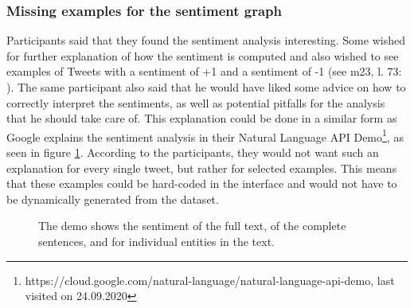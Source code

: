 \subsubsection*{Missing examples for the sentiment graph}
Participants said that they found the sentiment analysis interesting. Some wished for further explanation of how the sentiment is computed and also wished to see examples of Tweets with a sentiment of +1 and a sentiment of -1 (see m23, l. 73: ).
The same participant also said that he would have liked some advice on how to correctly interpret the sentiments, as well as potential pitfalls for the analysis that he should take care of. This explanation could be done in a similar form as Google explains the sentiment analysis in their Natural Language API Demo\footnote{https://cloud.google.com/natural-language/natural-language-api-demo, last visited on 24.09.2020}, as seen in figure \ref{fig:sentiment_google}. According to the participants, they would not want such an explanation for every single tweet, but rather for selected examples. This means that these examples could be hard-coded in the interface and would not have to be dynamically generated from the dataset.

\begin{figure}[htbp]
    \caption{The demo shows the sentiment of the full text, of the complete sentences, and for individual entities in the text.}
    \label{fig:sentiment_google}
\end{figure}

